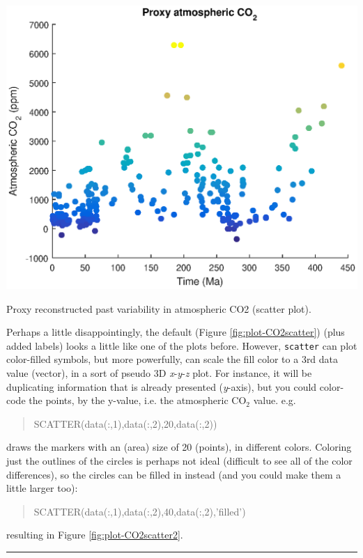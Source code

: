 \documentclass{tufte-book} %
\newenvironment{docspec}{\begin{quotation}\ttfamily\parskip0pt\parindent0pt\ignorespaces}{\end{quotation}}
\begin{document}
\begin{marginfigure}[-0.0in]
\includegraphics[width=\linewidth]{plot-CO2scatter2.eps}
\caption{Proxy reconstructed past variability in atmospheric CO2 (scatter plot).}
\label{fig:plot-CO2scatter2}
\end{marginfigure} 

Perhaps a little disappointingly, the default (Figure  \ref{fig:plot-CO2scatter}) (plus added labels) looks a little like one of the plots before. However, \texttt{scatter} can plot color-filled symbols, but more powerfully, can scale the fill color to a 3rd data value (vector), in a sort of pseudo 3D \textit{x}-\textit{y}-\textit{z} plot.  For instance, it will be duplicating information that is already presented (\textit{y}-axis), but you could color-code the points, by the y-value, i.e. the atmospheric CO\(_{2}\) value. e.g.
\begin{docspec}
SCATTER(data(:,1),data(:,2),20,data(:,2))
\end{docspec}
draws the markers with an (area) size of 20 (points), in different colors. Coloring just the outlines of the circles is perhaps not ideal (difficult to see all of the color differences), so the circles can be filled in instead (and you could make them a little larger too):
\begin{docspec}
SCATTER(data(:,1),data(:,2),40,data(:,2),'filled')
\end{docspec}
resulting in Figure \ref{fig:plot-CO2scatter2}.

\vspace{1mm}
\noindent\rule{4cm}{0.5pt}
\end{document}
